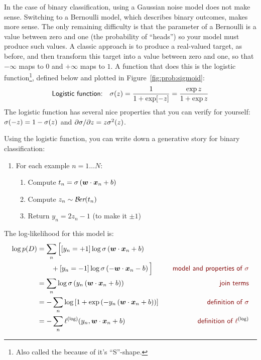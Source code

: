 In the case of binary classification, using a Gaussian noise model
does not make sense.  Switching to a Bernoulli model, which describes
binary outcomes, makes more sense.  The only remaining difficulty is
that the parameter of a Bernoulli is a value between zero and one (the
probability of ``heads'') so your model must produce such values.  A
classic approach is to produce a real-valued target, as before, and
then transform this target into a value between zero and one, so that
$-\infty$ maps to $0$ and $+\infty$ maps to $1$.  A function that does
this is the logistic function\footnote{Also called the
   because of it's ``S''-shape.}, defined
below and plotted in Figure~\ref{fig:prob:sigmoid}:
%
%
\begin{equation}
\textsf{Logistic function:} \quad
\sigma(z) = \frac 1 {1 + \exp[-z]} = \frac {\exp z}{1 + \exp z}
\end{equation}
%
The logistic function has several nice properties that you can verify
for yourself: $\sigma(-z) = 1 - \sigma(z)$ and $\partial \sigma/\partial z = z
\sigma^2(z)$.

Using the logistic function, you can write down a generative story for
binary classification:

\begin{enumerate}
  \item For each example $n=1 \dots N$:
    \begin{enumerate}
      \item Compute $t_n = \sigma\left({\boldsymbol{w}} \cdot {\boldsymbol{x}}_n + b\right)$
      \item Compute $z_n \sim \mathcal{B}\hspace{-0.5mm}\textit{er}(t_n)$
      \item Return $y_n = 2 z_n - 1$ (to make it $\pm 1$)
    \end{enumerate}
\end{enumerate}

The log-likelihood for this model is:
%
\begin{align}
   \log p(D)
&= \sum_n \Big[ [y_n=+1] \log \si\left(\dotp{\vw}{\vx_n} + b\right)\nonumber\\
&\qquad
               + [y_n=-1] \log \si\left(-\dotp{\vw}{\vx_n} - b\right)
            \Big]
   \becauseof{model and properties of $\si$}\\
&= \sum_n \log \si\left( y_n \left(\dotp{\vw}{\vx_n} + b\right)\right)
   \becauseof{join terms} \\
&= - \sum_n \log \left[ 1 + \exp\left( - y_n \left(\dotp{\vw}{\vx_n} +
      b\right)\right) \right]
    \becauseof{definition of $\si$}\\
&= - \sum_n \ell\xth{log}(y_n, \dotp{\vw}{\vx_n} + b)
    \becauseof{definition of $\ell\xth{log}$}
\end{align}


